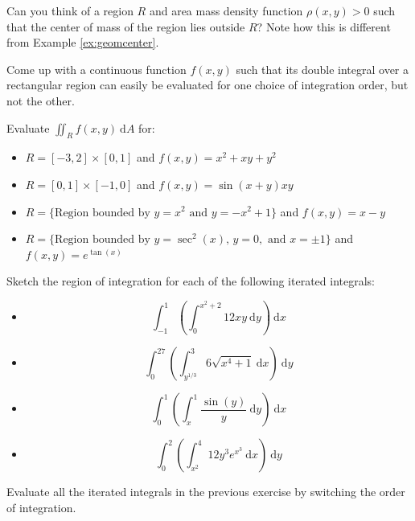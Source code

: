 \begin{exerciselist}
     \item Can you think of a region $R$ and area mass density function $\rho(x,y) > 0 $ such that the center of mass of the region lies outside $R$? Note how this is different from Example \ref{ex:geomcenter}.
     \item Come up with a continuous function $f(x,y)$ such that its double integral over a rectangular region can easily be evaluated for one choice of integration order, but not the other.
     \item Evaluate $\iint_{R} f(x,y) \ \mathrm{d} A$ for:
     \begin{itemize}
        \item $R = [-3,2] \times [0,1]$ and $f(x,y) = x^2 + x y + y^2$
        \item $R = [0,1] \times [-1,0]$ and $f(x,y) = \sin(x+y) x y$
        \item $R = \{\text{Region bounded by } y=x^2 \text{ and } y=-x^2+1\}$ and $f(x,y) = x - y$
        \item $R = \{\text{Region bounded by } y=\sec^2(x), \, y=0, \text{ and } x=\pm1\}$ and $f(x,y) = e^{\tan(x)}$
     \end{itemize}
     \item Sketch the region of integration for each of the following iterated integrals:
     \begin{itemize}
        \item \begin{equation*}\int_{-1}^{1} \left( \int_{0}^{x^2+2} 12 x y \ \mathrm{d} y\right) \ \mathrm{d} x\end{equation*}
        \item \begin{equation*}\int_{0}^{27} \left( \int_{y^{1/3}}^{3}6\sqrt{x^4+1} \ \mathrm{d} x\right) \ \mathrm{d} y\end{equation*}
        \item \begin{equation*}\int_{0}^{1} \left( \int_{x}^{1} \frac{\sin(y)}{y}\ \mathrm{d} y\right) \ \mathrm{d} x\end{equation*}
        \item \begin{equation*}\int_{0}^{2} \left( \int_{x^2}^{4} 12 y^3 e^{x^3} \ \mathrm{d} x\right) \ \mathrm{d} y
        \end{equation*}
     \end{itemize}
     \item Evaluate all the iterated integrals in the previous exercise by switching the order of integration.

\end{exerciselist}
